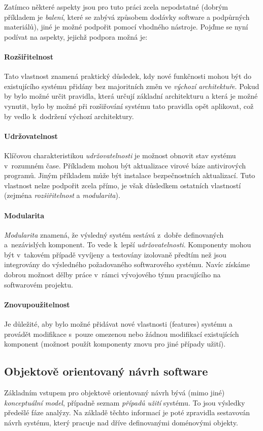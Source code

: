 Zatímco některé aspekty jsou pro tuto práci zcela nepodstatné (dobrým příkladem je \emph{balení}, které se zabývá způsobem dodávky software a podpůrných materiálů), jiné je možné podpořit pomocí vhodného nástroje. Pojďme se nyní podívat na aspekty, jejichž podpora možná je:

\paragraph{Rozšiřitelnost} Tato vlastnost znamená praktický důsledek, kdy nové funkčnosti mohou být do existujícího systému přidány bez majoritních změn ve \emph{výchozí architektuře}. Pokud by bylo možné určit pravidla, která určují základní architekturu a která je možné vynutit, bylo by možné při rozšiřování systému tato pravidla opět aplikovat, což by vedlo k~dodržení výchozí architektury.

\paragraph{Udržovatelnost} Klíčovou charakteristikou \emph{udržovatelnosti} je možnost obnovit stav systému v~rozumném čase. Příkladem mohou být aktualizace virové báze antivirových programů. Jiným příkladem může být instalace bezpečnostních aktualizací. Tuto vlastnost nelze podpořit zcela přímo, je však důsledkem ostatních vlastností (zejména \emph{rozšiřitelnost} a \emph{modularita}).

\paragraph{Modularita} \emph{Modularita} znamená, že výsledný systém sestává z~dobře definovaných a~nezávislých komponent. To vede k~lepší \emph{udržovatelnosti}. Komponenty mohou být v~takovém případě vyvíjeny a testovány izolovaně předtím než jsou integrovány do výsledného požadovaného softwarového systému. Navíc získáme dobrou možnost dělby práce v~rámci vývojového týmu pracujícího na softwarovém projektu.

\paragraph{Znovupoužitelnost} Je důležité, aby bylo možné přidávat nové vlastnosti (features) systému a provádět modifikace s~pouze omezenou nebo žádnou modifikací existujících komponent (možnost použít komponenty znovu pro jiné případy užití).

\subsection{Objektově orientovaný návrh software}
Základním vstupem pro objektově orientovaný návrh bývá (mimo jiné) \emph{konceptuální model}, případně seznam \emph{případů užití} systému. To jsou výsledky předešlé fáze analýzy. Na základě těchto informací je poté zpravidla sestavován návrh systému, který pracuje nad dříve definovanými doménovými objekty.

